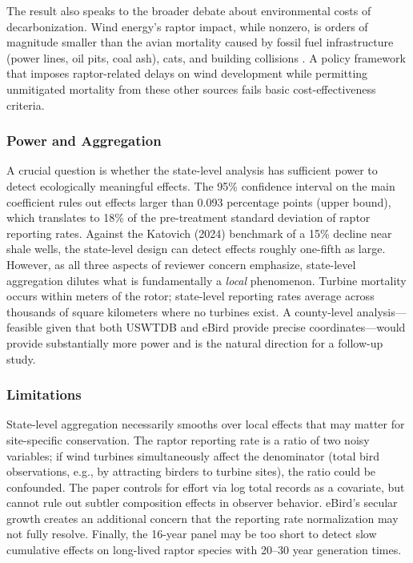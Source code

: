 \documentclass[12pt]{article}
\begin{document}
The result also speaks to the broader debate about environmental costs of decarbonization. Wind energy's raptor impact, while nonzero, is orders of magnitude smaller than the avian mortality caused by fossil fuel infrastructure (power lines, oil pits, coal ash), cats, and building collisions \citep{loss2013bird}. A policy framework that imposes raptor-related delays on wind development while permitting unmitigated mortality from these other sources fails basic cost-effectiveness criteria.

\subsubsection*{Power and Aggregation} A crucial question is whether the state-level analysis has sufficient power to detect ecologically meaningful effects. The 95\% confidence interval on the main coefficient rules out effects larger than 0.093 percentage points (upper bound), which translates to 18\% of the pre-treatment standard deviation of raptor reporting rates. Against the Katovich (2024) benchmark of a 15\% decline near shale wells, the state-level design can detect effects roughly one-fifth as large. However, as all three aspects of reviewer concern emphasize, state-level aggregation dilutes what is fundamentally a \textit{local} phenomenon. Turbine mortality occurs within meters of the rotor; state-level reporting rates average across thousands of square kilometers where no turbines exist. A county-level analysis---feasible given that both USWTDB and eBird provide precise coordinates---would provide substantially more power and is the natural direction for a follow-up study.

\subsubsection*{Limitations} State-level aggregation necessarily smooths over local effects that may matter for site-specific conservation. The raptor reporting rate is a ratio of two noisy variables; if wind turbines simultaneously affect the denominator (total bird observations, e.g., by attracting birders to turbine sites), the ratio could be confounded. The paper controls for effort via log total records as a covariate, but cannot rule out subtler composition effects in observer behavior. eBird's secular growth creates an additional concern that the reporting rate normalization may not fully resolve. Finally, the 16-year panel may be too short to detect slow cumulative effects on long-lived raptor species with 20--30 year generation times.
\end{document}
